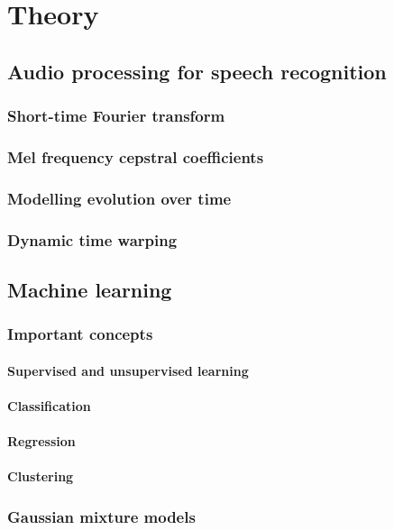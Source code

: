  
\chapter{Theory}

\section{Audio processing for speech recognition}
\subsection{Short-time Fourier transform}
\subsection{Mel frequency cepstral coefficients}
\subsection{Modelling evolution over time}
\subsection{Dynamic time warping}

\section{Machine learning}
\subsection{Important concepts}
\subsubsection{Supervised and unsupervised learning}
\subsubsection{Classification}
\subsubsection{Regression}
\subsubsection{Clustering}
\subsection{Gaussian mixture models}

